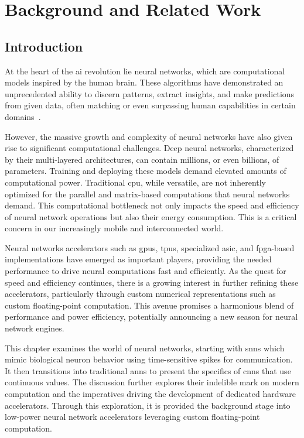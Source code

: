 \chapter{Background and Related Work}\label{chap.background}
\minitoc
\section{Introduction}
At the heart of the \gls{ai} revolution lie neural networks, which are computational models inspired by the human brain. These algorithms have demonstrated an unprecedented ability to discern patterns, extract insights, and make predictions from given data, often matching or even surpassing human capabilities in certain domains~\cite{silver2016mastering, gulshan2016development, lake2015human, xiong2016achieving, brown2020language}.

However, the massive growth and complexity of neural networks have also given rise to significant computational challenges. Deep neural networks, characterized by their multi-layered architectures, can contain millions, or even billions, of parameters. Training and deploying these models demand elevated amounts of computational power. Traditional \gls{cpu}, while versatile, are not inherently optimized for the parallel and matrix-based computations that neural networks demand. This computational bottleneck not only impacts the speed and efficiency of neural network operations but also their energy consumption. This is a critical concern in our increasingly mobile and interconnected world.

Neural networks accelerators such as \glspl{gpu}, \glspl{tpu}, specialized \gls{asic}, and \gls{fpga}-based implementations have emerged as important players, providing the needed performance to drive neural computations fast and efficiently. As the quest for speed and efficiency continues, there is a growing interest in further refining these accelerators, particularly through custom numerical representations such as custom floating-point computation. This avenue promises a harmonious blend of performance and power efficiency, potentially announcing a new season for neural network engines.

This chapter examines the world of neural networks, starting with \glspl{snn} which mimic biological neuron behavior using time-sensitive spikes for communication. It then transitions into traditional \glspl{ann} to present the specifics of \glspl{cnn} that use continuous values. The discussion further explores their indelible mark on modern computation and the imperatives driving the development of dedicated hardware accelerators. Through this exploration, it is provided the background stage into low-power neural network accelerators leveraging custom floating-point computation.

